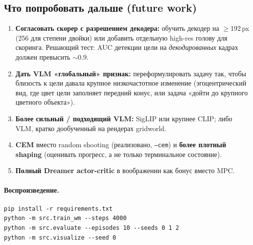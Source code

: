 \documentclass[11pt]{article}
\begin{document}
\subsection{Что попробовать дальше (future work)}
\begin{enumerate}
  \item \textbf{Согласовать скорер с разрешением декодера:} обучить декодер на
  $\geq$192\,px (256 для степени двойки) или добавить отдельную high-res голову для
  скоринга. Решающий тест: AUC детекции цели на \emph{декодированных} кадрах должен
  превысить $\sim$0.9.
  \item \textbf{Дать VLM «глобальный» признак:} переформулировать задачу так, чтобы
  близость к цели давала крупное низкочастотное изменение (эгоцентрический вид, где цвет
  цели заполняет передний конус, или задача «дойти до крупного цветного объекта»).
  \item \textbf{Более сильный / подходящий VLM:} SigLIP или крупнее CLIP; либо VLM,
  кратко дообученный на рендерах gridworld.
  \item \textbf{CEM} вместо random shooting (реализовано, \texttt{--cem}) и \textbf{более
  плотный shaping} (оценивать прогресс, а не только терминальное состояние).
  \item \textbf{Полный Dreamer actor-critic} в воображении как бонус вместо MPC.
\end{enumerate}

\paragraph{Воспроизведение.}
\begin{verbatim}
pip install -r requirements.txt
python -m src.train_wm --steps 4000
python -m src.evaluate --episodes 10 --seeds 0 1 2
python -m src.visualize --seed 0
\end{verbatim}
\end{document}
